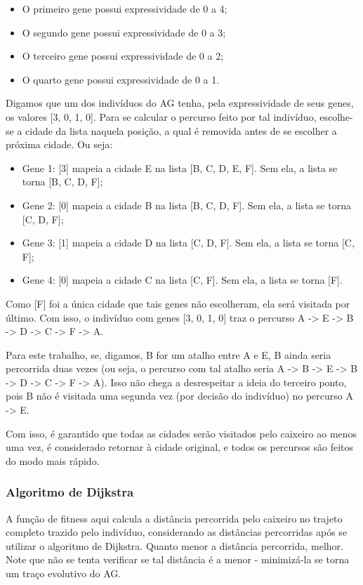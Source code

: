 \begin{itemize}
	\item O primeiro gene possui expressividade de 0 a 4;
	\item O segundo gene possui expressividade de 0 a 3;
	\item O terceiro gene possui expressividade de 0 a 2;
	\item O quarto gene possui expressividade de 0 a 1.
\end{itemize}

Digamos que um dos indivíduos do AG tenha, pela expressividade de seus genes, os valores [3, 0, 1, 0]. Para se calcular o percurso feito por tal indivíduo, escolhe-se a cidade da lista naquela posição, a qual é removida antes de se escolher a próxima cidade. Ou seja:

\begin{itemize}
	\item Gene 1: [3] mapeia a cidade E na lista [B, C, D, E, F]. Sem ela, a lista se torna [B, C, D, F];
	\item Gene 2: [0] mapeia a cidade B na lista [B, C, D, F]. Sem ela, a lista se torna [C, D, F];
	\item Gene 3: [1] mapeia a cidade D na lista [C, D, F]. Sem ela, a lista se torna [C, F];
	\item Gene 4: [0] mapeia a cidade C na lista [C, F]. Sem ela, a lista se torna [F].
\end{itemize}

Como [F] foi a única cidade que tais genes não escolheram, ela será visitada por último. Com isso, o indivíduo com genes [3, 0, 1, 0] traz o percurso A -> E -> B -> D -> C -> F -> A.

Para este trabalho, se, digamos, B for um atalho entre A e E, B ainda seria percorrida duas vezes (ou seja, o percurso com tal atalho seria A -> B -> E -> B -> D -> C -> F -> A). Isso não chega a desrespeitar a ideia do terceiro ponto, pois B não é visitada uma segunda vez (por decisão do indivíduo) no percurso A -> E.

Com isso, é garantido que todas as cidades serão visitados pelo caixeiro ao menos uma vez, é considerado retornar à cidade original, e todos os percursos são feitos do modo mais rápido.

\subsubsection*{Algoritmo de Dijkstra}

A função de fitness aqui calcula a distância percorrida pelo caixeiro no trajeto completo trazido pelo indivíduo, considerando as distâncias percorridas após se utilizar o algoritmo de Dijkstra. Quanto menor a distância percorrida, melhor. Note que não se tenta verificar se tal distância é a menor - minimizá-la se torna um traço evolutivo do AG.

